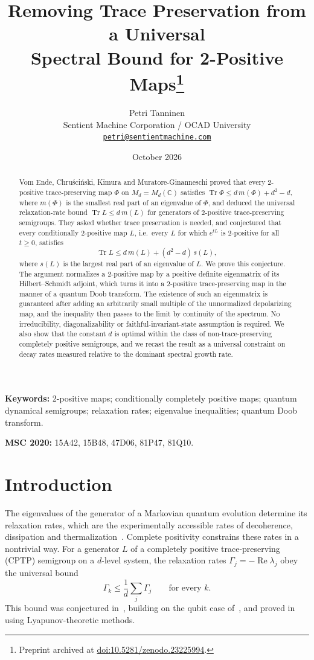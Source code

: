 \documentclass[11pt,a4paper]{article}
\title{\textbf{Removing Trace Preservation from a Universal\\ Spectral Bound for 2-Positive Maps}\thanks{Preprint archived at \href{https://doi.org/10.5281/zenodo.23225994}{doi:10.5281/zenodo.23225994}.}}
\author{%
	Petri Tanninen\\[2pt]
	\small Sentient Machine Corporation / OCAD University\\
	\small \href{mailto:petri@sentientmachine.com}{\texttt{petri@sentientmachine.com}}
}
\date{October 2026}
\theoremstyle{plain}
\theoremstyle{definition}
\theoremstyle{remark}
\numberwithin{equation}{section}
\newcommand{\C}{\mathbb{C}}
\newcommand{\M}{M_d}
\newcommand{\Tr}{\operatorname{Tr}}
\newcommand{\Rea}{\operatorname{Re}}
\newcommand{\mmin}{m}
\newcommand{\smax}{s}
\begin{document}
\maketitle

\begin{abstract}
Vom Ende, Chru\'sci\'nski, Kimura and Muratore-Ginanneschi proved that every
2-positive trace-preserving map $\Phi$ on $\M=M_d(\C)$ satisfies
$\Tr\Phi\le d\,\mmin(\Phi)+d^2-d$, where $\mmin(\Phi)$ is the smallest real part of
an eigenvalue of $\Phi$, and deduced the universal relaxation-rate bound
$\Tr L\le d\,\mmin(L)$ for generators of 2-positive trace-preserving semigroups.
They asked whether trace preservation is needed, and conjectured that every
conditionally 2-positive map $L$, i.e.\ every $L$ for which $e^{tL}$ is
2-positive for all $t\ge0$, satisfies
\[
  \Tr L\le d\,\mmin(L)+(d^2-d)\,\smax(L),
\]
where $\smax(L)$ is the largest real part of an eigenvalue of $L$.
We prove this conjecture. The argument normalizes a 2-positive map by a
positive definite eigenmatrix of its Hilbert--Schmidt adjoint, which turns it
into a 2-positive trace-preserving map in the manner of a quantum Doob
transform. The existence of such an eigenmatrix is guaranteed after adding an
arbitrarily small multiple of the unnormalized depolarizing map, and the
inequality then passes to the limit by continuity of the spectrum. No
irreducibility, diagonalizability or faithful-invariant-state assumption is
required. We also show that the constant $d$ is optimal within the class of
non-trace-preserving completely positive semigroups, and we recast the result as a
universal constraint on decay rates measured relative to the dominant spectral
growth rate.
\end{abstract}

\medskip
\noindent\textbf{Keywords:} 2-positive maps; conditionally completely positive maps;
quantum dynamical semigroups; relaxation rates; eigenvalue inequalities;
quantum Doob transform.

\smallskip
\noindent\textbf{MSC 2020:} 15A42, 15B48, 47D06, 81P47, 81Q10.

\section{Introduction}\label{sec:intro}

The eigenvalues of the generator of a Markovian quantum evolution determine its
relaxation rates, which are the experimentally accessible rates of decoherence,
dissipation and thermalization~\cite{BP02,AL07,RH12}. Complete positivity
constrains these rates in a nontrivial way. For a generator $L$ of a
completely positive trace-preserving (CPTP) semigroup on a $d$-level system, the
relaxation rates $\Gamma_j=-\Rea\lambda_j$ obey the universal bound
\begin{equation}\label{eq:rates-classical}
  \Gamma_k\le\frac1d\sum_{j}\Gamma_j \qquad\text{for every }k.
\end{equation}
This bound was conjectured in~\cite{CKKS21,CFKO21}, building on the qubit case
of~\cite{Kim02}, and proved in~\cite{MKC25} using Lyapunov-theoretic methods.
\end{document}
